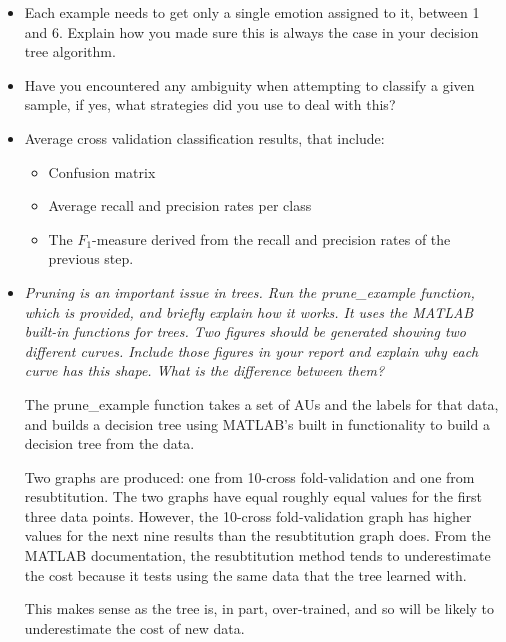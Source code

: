 \documentclass[a4paper]{article}
\begin{document}
\begin{itemize}
  \item Each example needs to get only a single emotion assigned to it, between
    1 and 6. Explain how you made sure this is always the case in your decision
    tree algorithm.

  \item Have you encountered any ambiguity when attempting to classify a given
    sample, if yes, what strategies did you use to deal with this?

  \item Average cross validation classification results, that include:
    \begin{itemize}
      \item Confusion matrix
      \item Average recall and precision rates per class
      \item The $F_1$-measure derived from the recall and precision rates of the
        previous step.
    \end{itemize}
    
  \item \emph{Pruning is an important issue in trees. Run the prune\_example
    function, which is provided, and briefly explain how it works. It uses the
    MATLAB built-in functions for trees. Two figures should be generated showing
    two different curves. Include those figures in your report and explain why
    each curve has this shape. What is the difference between them?}

    The prune\_example function takes a set of AUs and the labels for that data,
    and builds a decision tree using MATLAB's built in functionality to build a
    decision tree from the data. 

    Two graphs are produced: one from 10-cross fold-validation and one from 
    resubtitution. The two graphs have equal roughly equal values for the first 
    three data points. However, the 10-cross fold-validation graph has higher
    values for the next nine results than the resubtitution graph does. 
    From the MATLAB documentation, the resubtitution method tends to underestimate
    the cost because it tests using the same data that the tree learned with. 

    This makes sense as the tree is, in part, over-trained, and so will be likely to
    underestimate the cost of new data.


\end{itemize}
\end{document}

